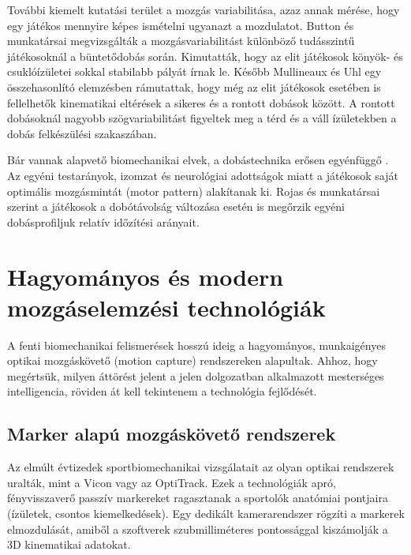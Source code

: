 További kiemelt kutatási terület a mozgás variabilitása, azaz annak mérése, hogy egy játékos mennyire képes ismételni ugyanazt a mozdulatot. Button és munkatársai \cite{Button2003} megvizsgálták a mozgásvariabilitást különböző tudásszintű játékosoknál a büntetődobás során. Kimutatták, hogy az elit játékosok könyök- és csuklóízületei sokkal stabilabb pályát írnak le. Később Mullineaux és Uhl \cite{Mullineaux2010} egy összehasonlító elemzésben rámutattak, hogy még az elit játékosok esetében is fellelhetők kinematikai eltérések a sikeres és a rontott dobások között. A rontott dobásoknál nagyobb szögvariabilitást figyeltek meg a térd és a váll ízületekben a dobás felkészülési szakaszában.

Bár vannak alapvető biomechanikai elvek, a dobástechnika erősen egyénfüggő \cite{Brisson1996, PenichetTomas2018}. Az egyéni testarányok, izomzat és neurológiai adottságok miatt a játékosok saját optimális mozgásmintát (motor pattern) alakítanak ki. Rojas és munkatársai \cite{Robins2006} szerint a játékosok a dobótávolság változása esetén is megőrzik egyéni dobásprofiljuk relatív időzítési arányait.

\section{Hagyományos és modern mozgáselemzési technológiák}
A fenti biomechanikai felismerések hosszú ideig a hagyományos, munkaigényes optikai mozgáskövető (motion capture) rendszereken alapultak. Ahhoz, hogy megértsük, milyen áttörést jelent a jelen dolgozatban alkalmazott mesterséges intelligencia, röviden át kell tekintenem a technológia fejlődését.

\subsection{Marker alapú mozgáskövető rendszerek}
Az elmúlt évtizedek sportbiomechanikai vizsgálatait az olyan optikai rendszerek uralták, mint a Vicon vagy az OptiTrack. Ezek a technológiák apró, fényvisszaverő passzív markereket ragasztanak a sportolók anatómiai pontjaira (ízületek, csontos kiemelkedések). Egy dedikált kamerarendszer rögzíti a markerek elmozdulását, amiből a szoftverek szubmilliméteres pontossággal kiszámolják a 3D kinematikai adatokat.

